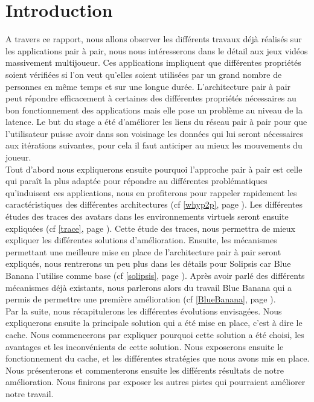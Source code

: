 \section{Introduction}
	A travers ce rapport, nous allons observer les différents travaux déjà réalisés sur les applications pair à pair, nous nous intéresserons dans le détail aux jeux vidéos massivement multijoueur. Ces applications impliquent que différentes propriétés soient vérifiées si l'on veut qu'elles soient utilisées par un grand nombre de personnes en même temps et sur une longue durée. L'architecture pair à pair peut répondre efficacement à certaines des différentes propriétés nécessaires au bon fonctionnement des applications mais elle pose un problème au niveau de la latence. Le but du stage a été d'améliorer les liens du réseau pair à pair pour que l'utilisateur puisse avoir dans son voisinage les données qui lui seront nécessaires aux itérations suivantes, pour cela il faut anticiper au mieux les mouvements du joueur.\\

	Tout d'abord nous expliquerons ensuite pourquoi l'approche pair à pair est celle qui paraît la plus adaptée pour répondre au différentes problématiques qu'induisent ces applications, nous en profiterons pour rappeler rapidement les caractéristiques des différentes architectures (cf \ref{whyp2p}, page \pageref{whyp2p}). Les différentes études des traces des avatars dans les environnements virtuels seront ensuite expliquées (cf \ref{trace}, page \pageref{trace}). Cette étude des traces, nous permettra de mieux expliquer les différentes solutions d'amélioration. Ensuite, les mécanismes permettant une meilleure mise en place de l'architecture pair à pair seront expliqués, nous rentrerons un peu plus dans les détails pour Solipsis car Blue Banana l'utilise comme base (cf \ref{solipsis}, page \pageref{solipsis}). Après avoir parlé des différents mécanismes déjà existants, nous parlerons alors du travail Blue Banana qui a permis de permettre une première amélioration (cf \ref{BlueBanana}, page \pageref{BlueBanana}). \\
	
	Par la suite, nous récapitulerons les différentes évolutions envisagées. Nous expliquerons ensuite la principale solution qui a été mise en place, c'est à dire le cache. Nous commencerons par expliquer pourquoi cette solution a été choisi, les avantages et les inconvénients de cette solution. Nous exposerons ensuite le fonctionnement du cache, et les différentes stratégies que nous avons mis en place. Nous présenterons et commenterons ensuite les différents résultats de notre amélioration. Nous finirons par exposer les autres pistes qui pourraient améliorer notre travail.

